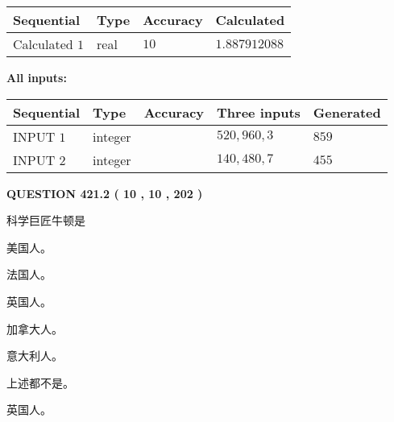\documentclass{ctexart}
\begin{document}
   
   
   
\noindent{}
   
   
  
  
\noindent\begin{tabular}{|l|l|l|l|}
\hline
 Sequential & Type & Accuracy & Calculated \\ 
\hline
 
 
  Calculated $  1 $ & real & $  10  $ & 
 $ 1.887912088 $ 
 \\  \hline  
 \end{tabular}
   
   
   
   
\noindent\vspace{0.1in}\hspace{-0.08in} {\textbf{\Large{All inputs: }}}
   
   
  
  
\noindent\begin{tabular}{|l|l|l|l|l|}
\hline
 Sequential & Type & Accuracy & Three inputs & Generated \\ 
\hline
 
 
  INPUT $  1 $ & integer &  & $
 520
 , 
 960
 , 
 3
 $ & $ 859 $ 
 \\  \hline  
 
 
  INPUT $  2 $ & integer &  & $
 140
 , 
 480
 , 
 7
 $ & $ 455 $ 
 \\  \hline  
 \end{tabular}
   
   
  
\vspace{0.2in}
  
{\textbf{\Large{QUESTION
421.2 
 ( 10 , 10 , 202 )
}}}
  
  
科学巨匠牛顿是
 
 
美国人。
 
 
法国人。
 
 
英国人。
 
 
加拿大人。
 
 
意大利人。
 
 
 上述都不是。
 
 
\noindent{}
 
 
英国人。
 
\end{document}
